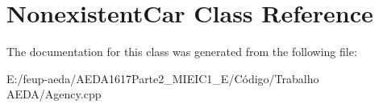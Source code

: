 \hypertarget{class_nonexistent_car}{}\section{Nonexistent\+Car Class Reference}
\label{class_nonexistent_car}


The documentation for this class was generated from the following file\+:\begin{DoxyCompactItemize}
\item 
E\+:/feup-\/aeda/\+A\+E\+D\+A1617\+Parte2\+\_\+M\+I\+E\+I\+C1\+\_\+\+E/\+Código/\+Trabalho A\+E\+D\+A/Agency.\+cpp\end{DoxyCompactItemize}
